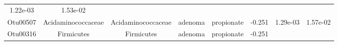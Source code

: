 \documentclass[11pt,]{article}
\begin{document}
\begin{longtable}[]{@{}cccccccc@{}}
\begin{minipage}[t]{0.08\columnwidth}
1.22e-03\strut
\end{minipage} & \begin{minipage}[t]{0.08\columnwidth}\centering\strut
1.53e-02\strut
\end{minipage}\tabularnewline
\begin{minipage}[t]{0.08\columnwidth}\centering\strut
Otu00507\strut
\end{minipage} & \begin{minipage}[t]{0.15\columnwidth}\centering\strut
Acidaminococcaceae\strut
\end{minipage} & \begin{minipage}[t]{0.15\columnwidth}\centering\strut
Acidaminococcaceae\strut
\end{minipage} & \begin{minipage}[t]{0.08\columnwidth}\centering\strut
adenoma\strut
\end{minipage} & \begin{minipage}[t]{0.09\columnwidth}\centering\strut
propionate\strut
\end{minipage} & \begin{minipage}[t]{0.07\columnwidth}\centering\strut
-0.251\strut
\end{minipage} & \begin{minipage}[t]{0.08\columnwidth}\centering\strut
1.29e-03\strut
\end{minipage} & \begin{minipage}[t]{0.08\columnwidth}\centering\strut
1.57e-02\strut
\end{minipage}\tabularnewline
\begin{minipage}[t]{0.08\columnwidth}\centering\strut
Otu00316\strut
\end{minipage} & \begin{minipage}[t]{0.15\columnwidth}\centering\strut
Firmicutes\strut
\end{minipage} & \begin{minipage}[t]{0.15\columnwidth}\centering\strut
Firmicutes\strut
\end{minipage} & \begin{minipage}[t]{0.08\columnwidth}\centering\strut
adenoma\strut
\end{minipage} & \begin{minipage}[t]{0.09\columnwidth}\centering\strut
propionate\strut
\end{minipage} & \begin{minipage}[t]{0.07\columnwidth}\centering\strut
-0.251\strut
\end{minipage} & \begin{minipage}[t]{0.08\columnwidth}\centering\strut

\end{minipage}
\end{longtable}
\end{document}
